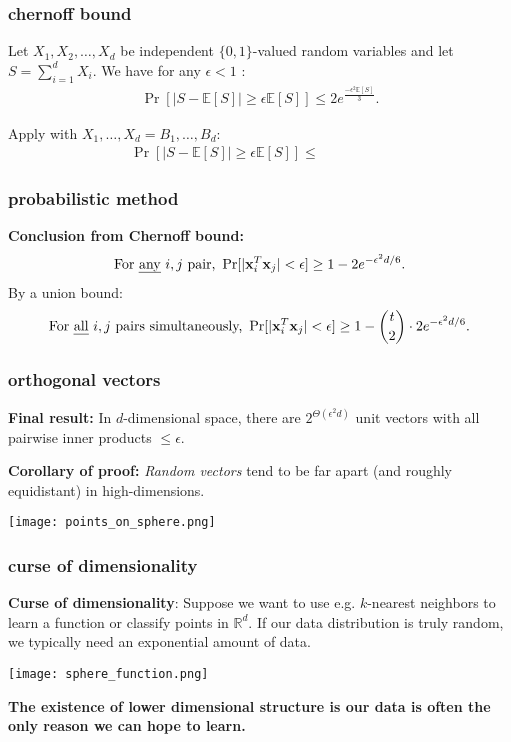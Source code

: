\documentclass[compress]{beamer}
\newcommand{\bv}[1]{\mathbf{#1}}
\newcommand{\R}{\mathbb{R}}
\newcommand{\E}{\mathbb{E}}
\begin{document}
\begin{frame}
	\frametitle{chernoff bound}
	\begin{theorem}
		Let $X_1,X_2,\ldots,X_d$ be independent $\{0,1\}$-valued random variables and let
		$S = \sum_{i=1}^{d} X_i$. We have for any $\epsilon < 1$ :
		\begin{align*}
			\Pr[|S - \E[S]| \geq \epsilon\E[S]] \leq 2e^{\frac{-\epsilon^2\E[S]}{3}}.
		\end{align*}
	\end{theorem} 
	Apply with $X_1, \ldots, X_d = B_1, \ldots, B_d$:
	\begin{align*}
	\Pr[|S - \E[S]| \geq \epsilon\E[S]] \leq \hspace{5em}
\end{align*}
\end{frame}

\begin{frame}[t]
	\frametitle{probabilistic method}
	\textbf{Conclusion from Chernoff bound:}
	\begin{align*}
		\text{For \emph{any} $i,j$ pair, }\Pr[|\bv{x}_i^T\bv{x}_j| < \epsilon] \geq 1 -  2e^{-\epsilon^2 d/6}.
	\end{align*}
	By a union bound:
	\begin{align*}
	\text{For \emph{all} $i,j$ pairs simultaneously, }\Pr[|\bv{x}_i^T\bv{x}_j| < \epsilon] \geq 1- {t\choose 2} \cdot 2e^{-\epsilon^2 d/6} .
	\end{align*}
\end{frame}

\begin{frame}[t]
	\frametitle{orthogonal vectors}
	\textbf{Final result:} In $d$-dimensional space, there are $2^{\Theta(\epsilon^2 d)}$ unit vectors with all pairwise inner products $\leq \epsilon$. 
	
	\vspace{1em}
	\textbf{Corollary of proof:} \emph{Random vectors} tend to be far apart (and roughly equidistant) in high-dimensions.
	\vspace{3em}
	\begin{center}
		\texttt{[image: points\_on\_sphere.png]}
	\end{center}
	
\end{frame}

\begin{frame}[t]
	\frametitle{curse of dimensionality}
	\alert{\textbf{Curse of dimensionality}}: Suppose we want to use e.g. $k$-nearest neighbors to learn a function or classify points in $\R^d$. If our data distribution is truly random, we typically need an exponential amount of data. 
	\begin{center}
		\texttt{[image: sphere\_function.png]}
	\end{center}
		\textbf{The existence of lower dimensional structure is our data is often the only reason we can hope to learn.}

\end{frame}
\end{document}
